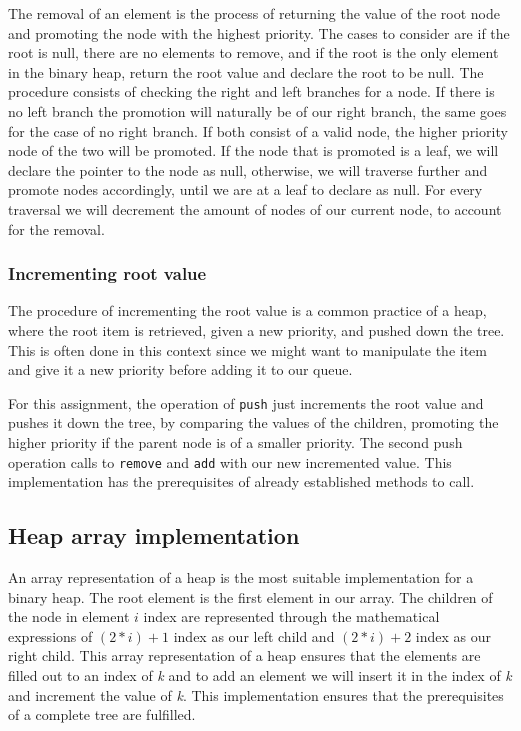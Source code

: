 \documentclass[a4paper,11pt]{article}
\begin{document}
            The removal of an element is the process of returning the value of the root node and promoting the node with the highest priority. The cases to consider are if the root is null, there are no elements to remove, and if the root is the only element in the binary heap, return the root value and declare the root to be null. The procedure consists of checking the right and left branches for a node. If there is no left branch the promotion will naturally be of our right branch, the same goes for the case of no right branch. If both consist of a valid node, the higher priority node of the two will be promoted. If the node that is promoted is a leaf, we will declare the pointer to the node as null, otherwise, we will traverse further and promote nodes accordingly, until we are at a leaf to declare as null. For every traversal we will decrement the amount of nodes of our current node, to account for the removal.

        \subsubsection*{Incrementing root value}

            The procedure of incrementing the root value is a common practice of a heap, where the root item is retrieved, given a new priority, and pushed down the tree. This is often done in this context since we might want to manipulate the item and give it a new priority before adding it to our queue. 
            
            For this assignment, the operation of \texttt{push} just increments the root value and pushes it down the tree, by comparing the values of the children, promoting the higher priority if the parent node is of a smaller priority. The second push operation calls to \texttt{remove} and \texttt{add} with our new incremented value. This implementation has the prerequisites of already established methods to call.

    \subsection*{Heap array implementation}

        An array representation of a heap is the most suitable implementation for a binary heap. The root element is the first element in our array. The children of the node in element $i$ index are represented through the mathematical expressions of $(2*i) + 1$ index as our left child and $(2*i) + 2$ index as our right child. This array representation of a heap ensures that the elements are filled out to an index of \textit{k} and to add an element we will insert it in the index of \textit{k} and increment the value of \textit{k}. This implementation ensures that the prerequisites of a complete tree are fulfilled.
\end{document}
